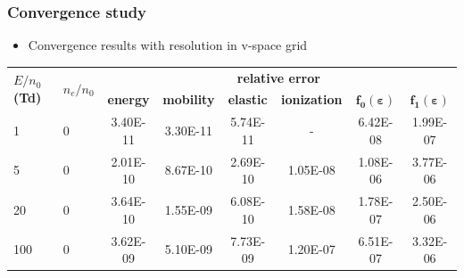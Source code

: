 \documentclass[mathserif, aspectratio=169]{beamer}
\begin{document}
\begin{frame}
	\frametitle{Convergence study}
	\begin{itemize}
		\item Convergence results with resolution in v-space grid
	\end{itemize}
	\begin{table}[!tbhp]
		\centering
		\renewcommand{\arraystretch}{1.2}
		\begin{tabular}{|p{1cm}|p{1cm}|c|c|c|c|c|c|}
		  \hline
		  \multirow{2}{1cm}{\textbf{$E/n_0$ (Td)}} & \multirow{2}{1cm}{\boldmath$n_e/n_0$} & \multicolumn{6}{c|}{\textbf{relative error}}  \\
		  \cline{3-8}
		  & & \textbf{energy} &\textbf{mobility} & \textbf{elastic} & \textbf{ionization} & {$\mathbf{f_0(\varepsilon)}$} & {$\mathbf{f_1(\varepsilon)}$}\\
		  \hline
		  1	  &  0 & 	3.40E-11 & 	3.30E-11	&  5.74E-11	&   -	     &   6.42E-08	&1.99E-07\\
		  5	  &  0 & 	2.01E-10 & 	8.67E-10	&  2.69E-10	& 1.05E-08 &   1.08E-06	&3.77E-06\\
		  20	&  0 &  3.64E-10 & 	1.55E-09	&  6.08E-10	& 1.58E-08 &   1.78E-07	&2.50E-06\\
		  100 &  0 & 	3.62E-09 & 	5.10E-09	&  7.73E-09	& 1.20E-07 &   6.51E-07	&3.32E-06\\
		  \hline                  

\end{tabular}
\end{table}
\end{frame}
\end{document}
